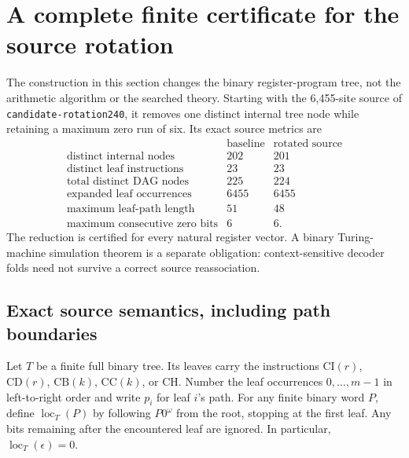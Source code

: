\section{A complete finite certificate for the source rotation}
\label{sec:boundary-rotation-certificate}

The construction in this section changes the binary register-program tree,
not the arithmetic algorithm or the searched theory.  Starting with the
6,455-site source of \texttt{candidate-rotation240}, it removes one distinct
internal tree node while retaining a maximum zero run of six.  Its exact
source metrics are
\[
 \begin{array}{c|cc}
 &\text{baseline}&\text{rotated source}\\\hline
 \text{distinct internal nodes}&202&201\\
 \text{distinct leaf instructions}&23&23\\
 \text{total distinct DAG nodes}&225&224\\
 \text{expanded leaf occurrences}&6455&6455\\
 \text{maximum leaf-path length}&51&48\\
 \text{maximum consecutive zero bits}&6&6.
 \end{array}
\]
The reduction is certified for every natural register vector.  A binary
Turing-machine simulation theorem is a separate obligation: context-sensitive
decoder folds need not survive a correct source reassociation.

\subsection{Exact source semantics, including path boundaries}

Let $T$ be a finite full binary tree.  Its leaves carry the instructions
$\mathrm{CI}(r)$, $\mathrm{CD}(r)$, $\mathrm{CB}(k)$,
$\mathrm{CC}(k)$, or $\mathrm{CH}$.  Number the leaf occurrences
$0,\ldots,m-1$ in left-to-right order and write $p_i$ for leaf $i$'s path.
For any finite binary word $P$, define $\operatorname{loc}_T(P)$ by
following $P0^\omega$ from the root, stopping at the first leaf.  Any bits
remaining after the encountered leaf are ignored.  In particular,
$\operatorname{loc}_T(\epsilon)=0$.

